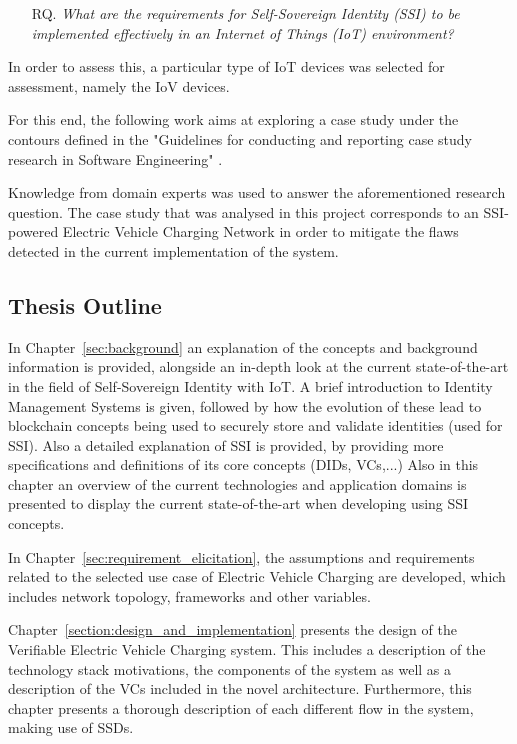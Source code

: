 \begin{itemize}[leftmargin=0.85in]
    \item[RQ.  ]\textit{ What are the requirements for Self-Sovereign Identity (SSI) to be implemented effectively in an Internet of Things (IoT) environment?}
\end{itemize}

In order to assess this, a particular type of IoT devices was selected for assessment, namely the \acrfull{IoV} devices. 

For this end, the following work aims at exploring a case study under the contours defined in the "Guidelines for conducting and reporting case study research in Software Engineering" \cite{Runeson2008}.

Knowledge from domain experts was used to answer the aforementioned research question. The case study that was analysed in this project corresponds to an SSI-powered Electric Vehicle Charging Network in order to mitigate the flaws detected in the current implementation of the system. 

\subsection{Thesis Outline}
\label{subsec:thesis_outline}

In Chapter~\ref{sec:background} an explanation of the concepts and background information is provided, alongside an in-depth look at the current state-of-the-art in the field of Self-Sovereign Identity with IoT. A brief introduction to Identity Management Systems is given, followed by how the evolution of these lead to blockchain concepts being used to securely store and validate identities (used for SSI). Also a detailed explanation of SSI is provided, by providing more specifications and definitions of its core concepts (DIDs, VCs,...) Also in this chapter an overview of the current technologies and application domains is presented to display the current state-of-the-art when developing using SSI concepts.

In Chapter~\ref{sec:requirement_elicitation}, the assumptions and requirements related to the selected use case of Electric Vehicle Charging are developed, which includes network topology, frameworks and other variables.

Chapter~\ref{section:design_and_implementation} presents the design of the Verifiable Electric Vehicle Charging system. This includes a description of the technology stack motivations, the components of the system as well as a description of the VCs included in the novel architecture. Furthermore, this chapter presents a thorough description of each different flow in the system, making use of \glspl{SSD}.


